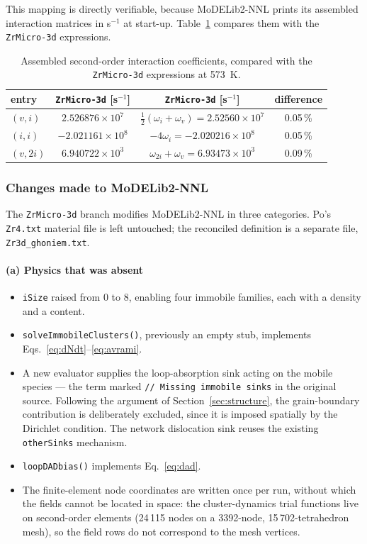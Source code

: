 \documentclass{article}
\newcommand{\ZrM}{\texttt{ZrMicro-3d}}
\newcommand{\MoD}{\textsf{MoDELib2-NNL}}
\begin{document}
This mapping is directly verifiable, because \MoD{} prints its assembled
interaction matrices in s$^{-1}$ at start-up. Table~\ref{tab:reactions}
compares them with the \ZrM{} expressions.

\begin{table}[htbp]
\centering
\caption{Assembled second-order interaction coefficients, compared with the
\ZrM{} expressions at 573~K.}
\label{tab:reactions}
\begin{tabular}{@{}lccc@{}}
\toprule
entry & \ZrM{} [s$^{-1}$] & \ZrM{} [s$^{-1}$] & difference \\
\midrule
$(v,i)$   & $2.526876\times 10^{7}$  & $\tfrac12(\omega_i+\omega_v) = 2.52560\times 10^{7}$ & 0.05\,\% \\
$(i,i)$   & $-2.021161\times 10^{8}$ & $-4\omega_i = -2.020216\times 10^{8}$                & 0.05\,\% \\
$(v,2i)$  & $6.940722\times 10^{3}$  & $\omega_{2i}+\omega_v = 6.93473\times 10^{3}$        & 0.09\,\% \\
\bottomrule
\end{tabular}
\end{table}

\subsubsection{Changes made to \MoD{}}
\label{sec:changes}

The \ZrM{} branch modifies \MoD{} in three categories. Po's \texttt{Zr4.txt}
material file is left untouched; the reconciled definition is a separate file,
\texttt{Zr3d\_ghoniem.txt}.

\paragraph*{(a) Physics that was absent}

\begin{itemize}
\item \texttt{iSize} raised from $0$ to $8$, enabling four immobile families,
each with a density and a content.
\item \texttt{solveImmobileClusters()}, previously an empty stub, implements
Eqs.~\eqref{eq:dNdt}--\eqref{eq:avrami}.
\item A new evaluator supplies the loop-absorption sink acting on the mobile
species --- the term marked \texttt{// Missing immobile sinks} in the original
source. Following the argument of Section~\ref{sec:structure}, the
grain-boundary contribution is deliberately excluded, since it is imposed
spatially by the Dirichlet condition. The network dislocation sink reuses the
existing \texttt{otherSinks} mechanism.
\item \texttt{loopDADbias()} implements Eq.~\eqref{eq:dad}.
\item The finite-element node coordinates are written once per run, without which
the fields cannot be located in space: the cluster-dynamics trial functions live
on second-order elements (24\,115 nodes on a 3392-node, 15\,702-tetrahedron
mesh), so the field rows do not correspond to the mesh vertices.
\end{itemize}
\end{document}
